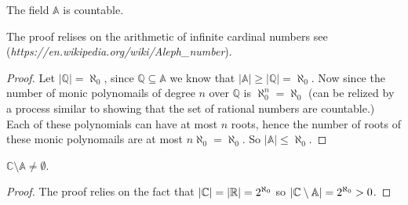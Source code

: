 \begin{theorem}
The field $\mathbb{A}$ is countable.
\end{theorem}
The proof relises on the arithmetic of infinite cardinal numbers see  \\ (\textit{https://en.wikipedia.org/wiki/Aleph\_number}).
\begin{proof}
Let $|\mathbb{Q}| = \aleph_{0}$, since $\mathbb{Q} \subseteq \mathbb{A}$ we know that $|\mathbb{A}| \geq |\mathbb{Q}| = \aleph_{0}$. Now since the number of monic polynomails of degree $n$ over $\mathbb{Q}$ is $\aleph_0^n = \aleph_{0}$ (can be relized by a process similar to showing that the set of rational numbers are countable.) Each of these polynomials can have at most $n$ roots, hence the number of roots of these monic polynomails are at most $n\aleph_0 = \aleph_0$. So $|\mathbb{A}| \leq \aleph_{0}$.
\end{proof}

\begin{corollary}
  $\mathbb{C} \setminus \mathbb{A} \neq \emptyset$.
\end{corollary}

\begin{proof}
The proof relies on the fact that $\left\lvert\mathbb{C}\right\rvert = \left\lvert\mathbb{R}\right\rvert = 2^{\aleph_0}$ so $\left\lvert\mathbb{C} \setminus \mathbb{A}\right\rvert = 2^{\aleph_0} > 0$.
\end{proof}
